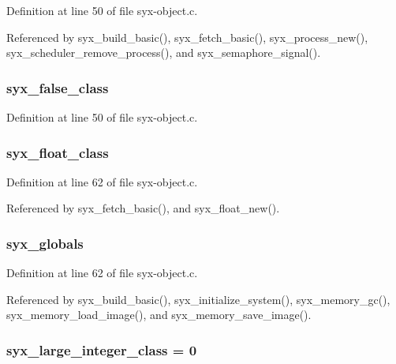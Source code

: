 Definition at line 50 of file syx-object.c.

Referenced by syx\_\-build\_\-basic(), syx\_\-fetch\_\-basic(), syx\_\-process\_\-new(), syx\_\-scheduler\_\-remove\_\-process(), and syx\_\-semaphore\_\-signal().\hypertarget{syx-object_8c_e5d45ff06a0c2cad939d22b799778717}{
\subsubsection{ {\bf syx\_\-false\_\-class}}}
\label{syx-object_8c_e5d45ff06a0c2cad939d22b799778717}




Definition at line 50 of file syx-object.c.\hypertarget{syx-object_8c_268191e05e6cedc5d62bd5b895293932}{
\subsubsection{ {\bf syx\_\-float\_\-class}}}
\label{syx-object_8c_268191e05e6cedc5d62bd5b895293932}




Definition at line 62 of file syx-object.c.

Referenced by syx\_\-fetch\_\-basic(), and syx\_\-float\_\-new().\hypertarget{syx-object_8c_1e96747d8e7efd0baede821f1d34b9db}{
\subsubsection{ {\bf syx\_\-globals}}}
\label{syx-object_8c_1e96747d8e7efd0baede821f1d34b9db}




Definition at line 62 of file syx-object.c.

Referenced by syx\_\-build\_\-basic(), syx\_\-initialize\_\-system(), syx\_\-memory\_\-gc(), syx\_\-memory\_\-load\_\-image(), and syx\_\-memory\_\-save\_\-image().\hypertarget{syx-object_8c_bc3a56814685116879a64cc0176b9e65}{
\subsubsection{ {\bf syx\_\-large\_\-integer\_\-class} = 0}}
\label{syx-object_8c_bc3a56814685116879a64cc0176b9e65}




